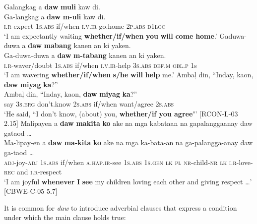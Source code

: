\ea
\label{bkm:Ref115094786}
Galangkag  a  \textbf{daw}  \textbf{muli}  kaw  di. \smallskip\\
\gll Ga-langkag  a  \textbf{daw}  \textbf{m-uli}  kaw  di. \\
\textsc{i.r}-expect  1\textsc{s.abs}  if/when  \textsc{i.v.ir}-go.home  2\textsc{p.abs}  \textsc{d}1\textsc{loc} \\
\glt ‘I am expectantly waiting \textbf{whether/if/when} \textbf{you} \textbf{will} \textbf{come} \textbf{home}.’
\z
\ea
Gaduwa-duwa  a  \textbf{daw}  \textbf{mabang}  kanen  an  ki  yaken. \smallskip\\
\gll Ga-duwa-duwa  a  \textbf{daw}  \textbf{m-tabang}  kanen  an  ki  yaken. \\
\textsc{i.r}-waver/doubt  1\textsc{s.abs}  if/when  \textsc{i.v.ir}-help  3\textsc{s.abs}  \textsc{def.m}  \textsc{obl.p}  1s \\
\glt ‘I am wavering \textbf{whether/if/when} \textbf{s/he} \textbf{will} \textbf{help} me.’
\z
\ea
Ambaļ  din,  “Inday,  kaon,  \textbf{daw}  \textbf{miyag}  \textbf{ka}?” \smallskip\\
\gll Ambaļ  din,  “Inday,  kaon,  \textbf{daw}  \textbf{miyag}  \textbf{ka}?” \\
say  3\textsc{s.erg}  don’t.know  2\textsc{s.abs}  if/when  want/agree  2\textsc{s.abs} \\
\glt `He said, “I don’t know, (about) you, \textbf{whether/if you agree}"’ [RCON-L-03 2.15]
\z
\ea
Malipayen  a  \textbf{daw}  \textbf{makita}  \textbf{ko}  ake  na  mga  kabataan na  gapalanggaanay  daw  gataod … \smallskip\\
\gll Ma-lipay-en  a  \textbf{daw}  \textbf{ma-kita}  \textbf{ko}  ake  na  mga  ka-bata-an na  ga-palangga-anay  daw  ga-taod … \\
\textsc{adj}-joy-\textsc{adj}  1\textsc{s.abs}  if/when  \textsc{a.hap.ir}-see  1\textsc{s.abs}  1\textsc{s.gen}  \textsc{lk}  \textsc{pl}  \textsc{nr}-child-\textsc{nr}
\textsc{lk}  \textsc{i.r}-love-\textsc{rec}  and  \textsc{i.r}-respect \\
\glt `I am joyful \textbf{whenever} \textbf{I} \textbf{see} my children loving each other and giving respect …’ [CBWE-C-05 5.7]
\z

It is common for \textit{daw} to introduce adverbial clauses that express a condition under which the main clause holds true:

